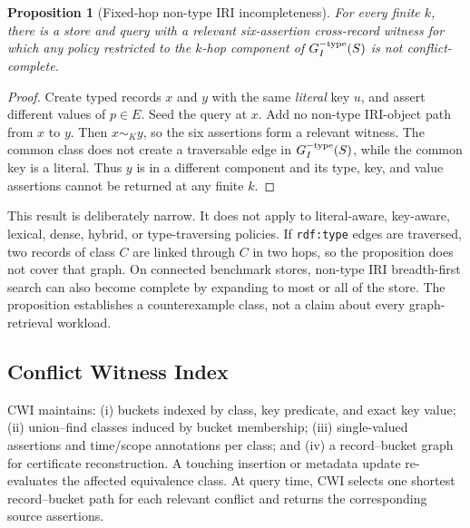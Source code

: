 \documentclass[letterpaper]{article} %
\newtheorem{proposition}{Proposition}
\newcommand{\cwi}{\textsc{CWI}}
\begin{document}
\begin{proposition}[Fixed-hop non-type IRI incompleteness]
For every finite $k$, there is a store and query with a relevant six-assertion
cross-record witness for which any policy restricted to the $k$-hop component
of $G_I^{-{\rm type}}(S)$ is not conflict-complete.
\end{proposition}
\begin{proof}
Create typed records $x$ and $y$ with the same \emph{literal} key $u$, and
assert different values of $p\in E$.  Seed the query at $x$.  Add no
non-type IRI-object path from $x$ to $y$.  Then $x\sim_K y$, so the six
assertions form a relevant witness.  The common class does not create a
traversable edge in $G_I^{-{\rm type}}(S)$, while the common key is a literal.
Thus $y$ is in a different component and its type, key, and value assertions
cannot be returned at any finite $k$.
\end{proof}

This result is deliberately narrow.  It does not apply to literal-aware,
key-aware, lexical, dense, hybrid, or type-traversing policies.  If
\texttt{rdf:type} edges are traversed, two records of class $C$ are linked
through $C$ in two hops, so the proposition does not cover that graph.  On
connected benchmark stores, non-type IRI breadth-first search can also become
complete by expanding to most or all of the store.  The proposition establishes
a counterexample class, not a claim about every graph-retrieval workload.

\subsection{Conflict Witness Index}

\cwi{} maintains: (i) buckets indexed by class, key predicate, and exact key
value; (ii) union--find classes induced by bucket membership; (iii)
single-valued assertions and time/scope annotations per class; and (iv) a
record--bucket graph for certificate reconstruction.  A touching insertion or
metadata update re-evaluates the affected equivalence class.  At query time,
\cwi{} selects one shortest record--bucket path for each relevant conflict and
returns the corresponding source assertions.
\end{document}
